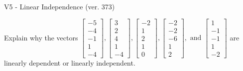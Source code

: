 \begin{exercise}
  \begin{exerciseTitle}V5 - Linear Independence (ver. 373)\end{exerciseTitle}
  \begin{exerciseStatement}
    Explain why the vectors \(\left[\begin{array}{r}
-5 \\
-4 \\
-1 \\
1 \\
-4
\end{array}\right] , \left[\begin{array}{r}
3 \\
2 \\
4 \\
1 \\
-4
\end{array}\right] , \left[\begin{array}{r}
-2 \\
1 \\
2 \\
1 \\
0
\end{array}\right] , \left[\begin{array}{r}
-2 \\
-2 \\
-6 \\
1 \\
2
\end{array}\right] , \text{ and } \left[\begin{array}{r}
1 \\
-1 \\
-1 \\
1 \\
-2
\end{array}\right]\) are linearly dependent or linearly independent.	



\end{exerciseStatement}
\end{exercise}
